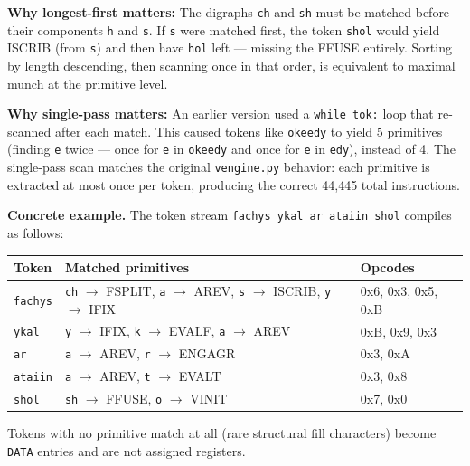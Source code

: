 \documentclass[12pt,a4paper]{article}
\begin{document}
\textbf{Why longest-first matters:} The digraphs \texttt{ch} and \texttt{sh} must be matched before their components \texttt{h} and \texttt{s}. If \texttt{s} were matched first, the token \texttt{shol} would yield ISCRIB (from \texttt{s}) and then have \texttt{hol} left --- missing the FFUSE entirely. Sorting by length descending, then scanning once in that order, is equivalent to maximal munch at the primitive level.

\textbf{Why single-pass matters:} An earlier version used a \texttt{while tok:} loop that re-scanned after each match. This caused tokens like \texttt{okeedy} to yield 5 primitives (finding \texttt{e} twice --- once for \texttt{e} in \texttt{okeedy} and once for \texttt{e} in \texttt{edy}), instead of 4. The single-pass scan matches the original \texttt{vengine.py} behavior: each primitive is extracted at most once per token, producing the correct 44,445 total instructions.

\textbf{Concrete example.} The token stream \texttt{fachys ykal ar ataiin shol} compiles as follows:

\begin{table}[htbp]
\centering
\small
{}
\begin{tabularx}{\textwidth}{>{\centering\arraybackslash}X >{\centering\arraybackslash}X >{\centering\arraybackslash}X}
\toprule
\rowcolor{gray!25}\textbf{Token} & \textbf{Matched primitives} & \textbf{Opcodes} \\
\midrule
\rowcolors{1}{white}{gray!10}
\texttt{fachys} & \texttt{ch} $\rightarrow$ FSPLIT, \texttt{a} $\rightarrow$ AREV, \texttt{s} $\rightarrow$ ISCRIB, \texttt{y} $\rightarrow$ IFIX & 0x6, 0x3, 0x5, 0xB \\
\texttt{ykal} & \texttt{y} $\rightarrow$ IFIX, \texttt{k} $\rightarrow$ EVALF, \texttt{a} $\rightarrow$ AREV & 0xB, 0x9, 0x3 \\
\texttt{ar} & \texttt{a} $\rightarrow$ AREV, \texttt{r} $\rightarrow$ ENGAGR & 0x3, 0xA \\
\texttt{ataiin} & \texttt{a} $\rightarrow$ AREV, \texttt{t} $\rightarrow$ EVALT & 0x3, 0x8 \\
\texttt{shol} & \texttt{sh} $\rightarrow$ FFUSE, \texttt{o} $\rightarrow$ VINIT & 0x7, 0x0 \\
\bottomrule
\end{tabularx}
\end{table}

Tokens with no primitive match at all (rare structural fill characters) become \texttt{DATA} entries and are not assigned registers.
\end{document}
